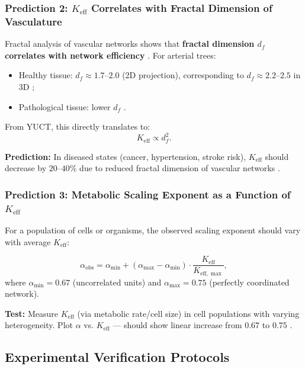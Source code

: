 \documentclass[12pt]{article}
\newcommand{\Keff}{K_{\mathrm{eff}}}
\begin{document}
	\subsubsection{Prediction 2: \(\Keff\) Correlates with Fractal Dimension of Vasculature}
	
	Fractal analysis of vascular networks shows that \textbf{fractal dimension \(d_f\) correlates with network efficiency} \cite{Gould1993}. For arterial trees:
	\begin{itemize}
		\item Healthy tissue: \(d_f \approx 1.7\)–\(2.0\) (2D projection), corresponding to \(d_f \approx 2.2\)–\(2.5\) in 3D \cite{Cross1993};
		\item Pathological tissue: lower \(d_f\) \cite{Gould1993}.
	\end{itemize}
	From YUCT, this directly translates to:
	\begin{equation}
		\Keff \propto d_f^{2}.
	\end{equation}
	
	\textbf{Prediction:} In diseased states (cancer, hypertension, stroke risk), \(\Keff\) should decrease by \(20\)–\(40\%\) due to reduced fractal dimension of vascular networks \cite{Gould1993}.
	
\subsubsection{Prediction 3: Metabolic Scaling Exponent as a Function of $\Keff$}

For a population of cells or organisms, the observed scaling exponent should vary with average $\Keff$:

\begin{equation}
	\alpha_{\text{obs}} = \alpha_{\min} + (\alpha_{\max} - \alpha_{\min}) \cdot \frac{\Keff}{K_{\mathrm{eff},\max}},
	\label{eq:scaling-exponent}
\end{equation}
where $\alpha_{\min} = 0.67$ (uncorrelated units) and $\alpha_{\max} = 0.75$ (perfectly coordinated network).

\textbf{Test:} Measure $\Keff$ (via metabolic rate/cell size) in cell populations with varying heterogeneity. Plot $\alpha$ vs. $\Keff$ — should show linear increase from $0.67$ to $0.75$ \cite{Takemoto2015}.
	
	\subsection{Experimental Verification Protocols}
	
\end{document}
